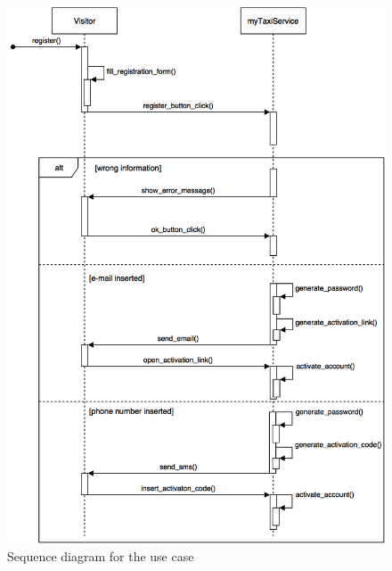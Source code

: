 \documentclass[a4paper,12pt]{article}%
\begin{document}
\begin{figure}[H]
\centering
\includegraphics[scale=.3]{Registration.png}
\caption{Sequence diagram for the use case}
\end{figure}
\break
\end{document}
